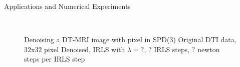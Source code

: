 \begin{chapter}{Applications and Numerical Experiments}
\begin{figure}[h!]
    \centering
    \\
    \caption[Denoising DT-MRI data]{Denoising a DT-MRI image with pixel in SPD(3)
	 Original DTI data, 32x32 pixel
	 Denoised, IRLS with $\lambda=?$, $?$ IRLS steps, $?$ newton steps per IRLS step
	\label{fig:application_dti1}
    }
\end{figure}



\FloatBarrier

\end{chapter}
